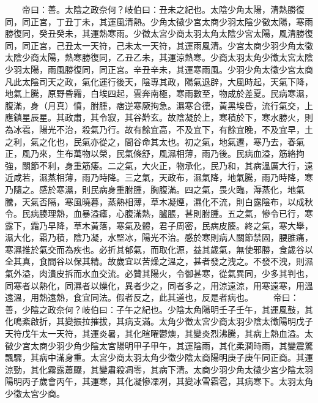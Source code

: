 　　帝曰：善。太陰之政奈何？岐伯曰：丑未之紀也。太陰少角太陽，清熱勝復同，同正宮，丁丑丁未，其運風清熱。少角太徵少宮太商少羽太陰少徵太陽，寒雨勝復同，癸丑癸未，其運熱寒雨。少徵太宮少商太羽太角太陰少宮太陽，風清勝復同，同正宮，己丑太一天符，己未太一天符，其運雨風清。少宮太商少羽少角太徵太陰少商太陽，熱寒勝復同，乙丑乙未，其運涼熱寒。少商太羽太角少徵太宮太陰少羽太陽，雨風勝復同，同正宮。辛丑辛未，其運寒雨風。少羽少角太徵少宮太商凡此太陰司天之政，氣化運行後天，陰專其政，陽氣退辟，大風時起，天氣下降，地氣上騰，原野昏霿，白埃四起，雲奔南極，寒雨數至，物成於差夏。民病寒濕，腹滿，身（月真）憤，胕腫，痞逆寒厥拘急。濕寒合德，黃黑埃昏，流行氣交，上應鎮星辰星。其政肅，其令寂，其谷黅玄。故陰凝於上，寒積於下，寒水勝火，則為冰雹，陽光不治，殺氣乃行。故有餘宜高，不及宜下，有餘宜晚，不及宜早，土之利，氣之化也，民氣亦從之，間谷命其太也。初之氣，地氣遷，寒乃去，春氣正，風乃來，生布萬物以榮，民氣條舒，風濕相薄，雨乃後。民病血溢，筋絡拘強，關節不利，身重筋痿。二之氣，大火正，物承化，民乃和，其病溫厲大行，遠近咸若，濕蒸相薄，雨乃時降。三之氣，天政布，濕氣降，地氣騰，雨乃時降，寒乃隨之。感於寒濕，則民病身重胕腫，胸腹滿。四之氣，畏火臨，溽蒸化，地氣騰，天氣否隔，寒風曉暮，蒸熱相薄，草木凝煙，濕化不流，則白露陰布，以成秋令。民病腠理熱，血暴溢瘧，心腹滿熱，臚脹，甚則胕腫。五之氣，慘令已行，寒露下，霜乃早降，草木黃落，寒氣及體，君子周密，民病皮腠。終之氣，寒大舉，濕大化，霜乃積，陰乃凝，水堅冰，陽光不治。感於寒則病人關節禁固，腰脽痛，寒濕推於氣交而為疾也。必折其郁氣，而取化源，益其歲氣，無使邪勝，食歲谷以全其真，食間谷以保其精。故歲宜以苦燥之溫之，甚者發之洩之。不發不洩，則濕氣外溢，肉潰皮拆而水血交流。必贊其陽火，令御甚寒，從氣異同，少多其判也，同寒者以熱化，同濕者以燥化，異者少之，同者多之，用涼遠涼，用寒遠寒，用溫遠溫，用熱遠熱，食宜同法。假者反之，此其道也，反是者病也。
　　帝曰：善，少陰之政奈何？岐伯曰：子午之紀也。少陰太角陽明壬子壬午，其運風鼓，其化鳴紊啟折，其變振拉摧拔，其病支滿。太角少徵太宮少商太羽少陰太徵陽明戊子天符戊午太一天符，其運炎暑，其化暄曜鬱燠，其變炎烈沸騰，其病上熱血溢。太徵少宮太商少羽少角少陰太宮陽明甲子甲午，其運陰雨，其化柔潤時雨，其變震驚飄驟，其病中滿身重。太宮少商太羽太角少徵少陰太商陽明庚子庚午同正商。其運涼勁，其化霧露蕭飋，其變肅殺凋零，其病下清。太商少羽少角太徵少宮少陰太羽陽明丙子歲會丙午，其運寒，其化凝慘凓冽，其變冰雪霜雹，其病寒下。太羽太角少徵太宮少商。
